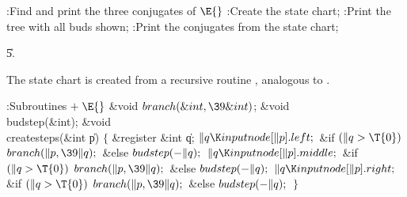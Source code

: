 \B{}:Find and print the three conjugates of \X${}\E{}$\6
:Create the state chart\X;\6
:Print the tree with all buds shown\X;\6
:Print the conjugates from the state chart\X;\par
\U5.\fi

The state chart is created from a recursive routine ,
analogous to .

\Y\B\4:Subroutines\X${}\mathrel+\E{}$\6
\&{void} ${}\\{branch}(\&{int},\39\&{int}){}$;\6
\&{void} \\{budstep}(\&{int});\7
\&{void} \\{createsteps}(\&{int} \|p)\1\1\2\2\6
${}\{{}$\1\6
\&{register} \&{int} \|q;\7
${}\|q\K\\{inputnode}[\|p].\\{left};{}$\6
\&{if} ${}(\|q>\T{0}){}$\1\5
${}\\{branch}(\|p,\39\|q);{}$\2\6
\&{else}\1\5
${}\\{budstep}({-}\|q);{}$\2\6
${}\|q\K\\{inputnode}[\|p].\\{middle};{}$\6
\&{if} ${}(\|q>\T{0}){}$\1\5
${}\\{branch}(\|p,\39\|q);{}$\2\6
\&{else}\1\5
${}\\{budstep}({-}\|q);{}$\2\6
${}\|q\K\\{inputnode}[\|p].\\{right};{}$\6
\&{if} ${}(\|q>\T{0}){}$\1\5
${}\\{branch}(\|p,\39\|q);{}$\2\6
\&{else}\1\5
${}\\{budstep}({-}\|q);{}$\2\6
\4${}\}{}$\2\par
\fi

